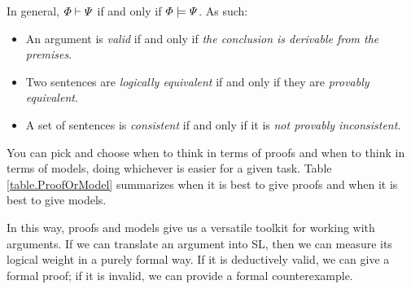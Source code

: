In general, $\varPhi{}\vdash\varPsi{}$ if and only if $\varPhi{}\models\varPsi{}$. As such:
\begin{itemize}
\item An argument is \emph{valid} if and only if \emph{the conclusion is derivable from the premises}.
\item Two sentences are \emph{logically equivalent} if and only if they are \emph{provably equivalent}.
\item A set of sentences is \emph{consistent} if and only if it is \emph{not provably inconsistent}.
\end{itemize}
You can pick and choose when to think in terms of proofs and when to think in terms of models, doing whichever is easier for a given task. Table \ref{table.ProofOrModel} summarizes when it is best to give proofs and when it is best to give models.

In this way, proofs and models give us a versatile toolkit for working with arguments. If we can translate an argument into SL, then we can measure its logical weight in a purely formal way. If it is deductively valid, we can give a formal proof; if it is invalid, we can provide a formal counterexample.

